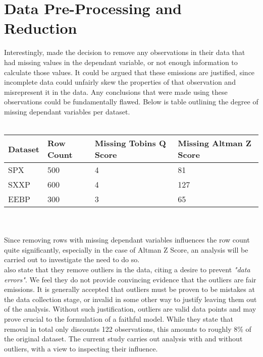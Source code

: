 \section{Data Pre-Processing and Reduction}
{Interestingly, \cite{moldovan2015learning} made the decision to remove any observations in their data that had missing values in the dependant variable, or not enough information to calculate those values. It could be argued that these emissions are justified, since incomplete data could unfairly skew the properties of that observation and misrepresent it in the data. Any conclusions that were made using these observations could be fundamentally flawed. Below is table outlining the degree of missing dependant variables per dataset. 
\\\\
\begin{tabular}{ |p{3cm}||p{3cm}|p{3cm}|p{3cm}|  }
 \hline
 Dataset & Row Count & Missing Tobins Q Score & Missing Altman Z Score\\
 \hline
 SPX & 500 & 4  & 81 \\
 SXXP &   600  & 4  & 127 \\
 EEBP & 300 & 3 &  65 \\
 \hline
\end{tabular}\\\\
Since removing rows with missing dependant variables influences the row count quite significantly, especially in the case of Altman Z Score, an analysis will be carried out to investigate the need to do so. \\

\cite{moldovan2015learning} also state that they remove outliers in the data, citing a desire to prevent {\it "data errors"}. We feel they do not provide convincing evidence that the outliers are fair emissions. It is generally accepted that outliers must be proven to be mistakes at the data collection stage, or invalid in some other way to justify leaving them out of the analysis. Without such justification, outliers are valid data points and may prove crucial to the formulation of a faithful model. While they state that removal in total only discounts 122 observations, this amounts to roughly 8\% of the original dataset. The current study carries out analysis with and without outliers, with a view to inspecting their influence. 
}
